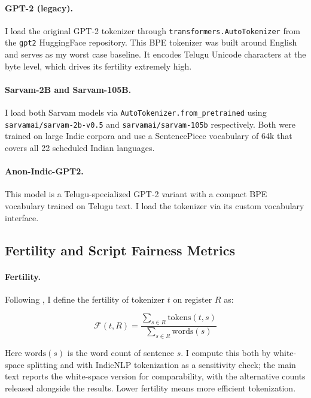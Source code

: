 ﻿\documentclass[11pt]{article}
\begin{document}
\paragraph{GPT-2 (legacy).}
I load the original GPT-2 tokenizer \citep{radford-etal-2019-gpt2}
through \texttt{transformers.AutoTokenizer} from the \texttt{gpt2}
HuggingFace repository. This BPE tokenizer was built around English
and serves as my worst case baseline. It encodes Telugu Unicode
characters at the byte level, which drives its fertility extremely
high.

\paragraph{Sarvam-2B and Sarvam-105B.}
I load both Sarvam models \citep{sarvam-2024} via
\texttt{AutoTokenizer.from\_pretrained} using
\texttt{sarvamai/sarvam-2b-v0.5} and \texttt{sarvamai/sarvam-105b}
respectively. Both were trained on large Indic corpora and use a
SentencePiece vocabulary of 64k that covers all 22 scheduled Indian
languages.

\paragraph{Anon-Indic-GPT2.}
This model \citep{anonymous-2026-indic} is a Telugu-specialized
GPT-2 variant with a compact BPE vocabulary trained on Telugu text.
I load the tokenizer via its custom vocabulary interface.

\subsection{Fertility and Script Fairness Metrics}

\paragraph{Fertility.}
Following \citet{rust-etal-2021-how}, I define the fertility of
tokenizer $t$ on register $R$ as:

\begin{equation}
    \mathcal{F}(t, R) =
        \frac{\displaystyle\sum_{s \in R} \mathrm{tokens}(t, s)}
             {\displaystyle\sum_{s \in R} \mathrm{words}(s)}
    \label{eq:fertility}
\end{equation}

Here $\mathrm{words}(s)$ is the word count of sentence $s$. I compute
this both by white-space splitting and with IndicNLP tokenization as
a sensitivity check; the main text reports the white-space version
for comparability, with the alternative counts released alongside the
results. Lower fertility means more efficient tokenization.
\end{document}
